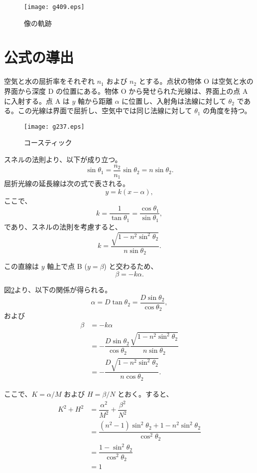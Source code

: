 \documentclass[twocolumn]{article}
\begin{document}
\begin{figure}
	\centering
	\texttt{[image: g409.eps]}
	\caption{像の軌跡}
	\label{fig:squashed_astroid}
\end{figure}

\section{公式の導出}

空気と水の屈折率をそれぞれ $n_1$ および $n_2$ とする。点状の物体 O は空気と水の界面から深度 D の位置にある。物体 O から発せられた光線は、界面上の点 A に入射する。点 A は $y$ 軸から距離 $\alpha$ に位置し、入射角は法線に対して $\theta_2$ である。この光線は界面で屈折し、空気中では同じ法線に対して $\theta_1$ の角度を持つ。

\begin{figure}
	\centering
	\texttt{[image: g237.eps]}
	\caption{コースティック}
	\label{fig:caustic}
\end{figure}

スネルの法則より、以下が成り立つ。
$$ \sin\theta_1 = \frac{n_2}{n_1} \sin\theta_2 = n\sin\theta_2.$$
屈折光線の延長線は次の式で表される。
$$y=k(x-\alpha),$$
ここで、
$$k=\dfrac{1}{\tan\theta_1}=\dfrac{\cos\theta_1}{\sin\theta_1},$$
であり、スネルの法則を考慮すると、
$$k=\dfrac{\sqrt{1-n^2\sin^2\theta_2}}{n\sin\theta_2}.$$

この直線は $y$ 軸上で点 B ($y=\beta$) と交わるため、
$$\beta = -k\alpha.$$

図\ref{fig:caustic}より、以下の関係が得られる。
$$\alpha = D\tan\theta_2 = \dfrac{D\sin\theta_2}{\cos\theta_2},$$
および
$$\begin{aligned}
	\beta &= -k\alpha \\
	&= -\dfrac{D\sin\theta_2}{\cos\theta_2}
	\dfrac{\sqrt{1-n^2\sin^2\theta_2}}{n\sin\theta_2}\\
	&=-\dfrac{D\sqrt{1-n^2\sin^2\theta_2}}{n\cos\theta_2}.
\end{aligned}$$

ここで、$K=\alpha/M$ および $H=\beta/N$ とおく。すると、
$$ \begin{aligned}
	K^2 + H^2 &= \dfrac{\alpha^2}{M^2}+\dfrac{\beta^2}{N^2}\\
	&=\dfrac{\left(n^2-1\right)\sin^2\theta_2 + 1-n^2\sin^2\theta_2}
	{\cos^2\theta_2}\\
	&=\dfrac{1-\sin^2\theta_2}{\cos^2\theta_2}\\
	&=1
\end{aligned}$$
\end{document}
